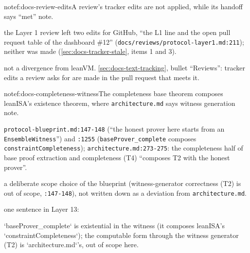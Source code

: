 \begin{finding}{note}{f:docs-review-edits}{A review's tracker edits are not applied, while its handoff says ``met''}
 note.
 \begin{sloppypar}
the Layer 1 review left two edits for GitHub, ``the L1 line and the open pull request table of the dashboard \#12'' (\texttt{docs/\allowbreak{}reviews/\allowbreak{}protocol-\allowbreak{}layer1.\allowbreak{}md:\allowbreak{}211}); neither was made (\cref{sec:docs-tracker-stale}, items 1 and 3).
\end{sloppypar}
 not a divergence from leanVM.
 \cref{sec:docs-text-tracking}, bullet ``Reviews'': tracker edits a review asks for are made in the pull request that meets it.
\end{finding}

\begin{finding}{note}{f:docs-completeness-witness}{The completeness base theorem composes leanISA's existence theorem, where \texttt{architecture.\allowbreak{}md} says witness generation}
 note.
 \begin{sloppypar}
\texttt{protocol-\allowbreak{}blueprint.\allowbreak{}md:\allowbreak{}147-\allowbreak{}148} (``the honest prover here starts from an \texttt{Ensemble\allowbreak{}Witness}'') and \texttt{:\allowbreak{}1255} (\texttt{base\allowbreak{}Prover\_\allowbreak{}complete} composes \texttt{constraint\allowbreak{}Completeness}); \texttt{architecture.\allowbreak{}md:\allowbreak{}273-\allowbreak{}275}: the completeness half of base proof extraction and completeness (T4) ``composes T2 with the honest prover''.
\end{sloppypar}
 \begin{sloppypar}
a deliberate scope choice of the blueprint (witness-generator correctness (T2) is out of scope, \texttt{:\allowbreak{}147-\allowbreak{}148}), not written down as a deviation from \texttt{architecture.\allowbreak{}md}.
\end{sloppypar}
 one sentence in Layer 13:

\begin{srccode}
`baseProver_complete` is existential in the witness (it composes leanISA's `constraintCompleteness`); the computable form through the witness generator (T2) is `architecture.md`'s, out of scope here.
\end{srccode}
\end{finding}

